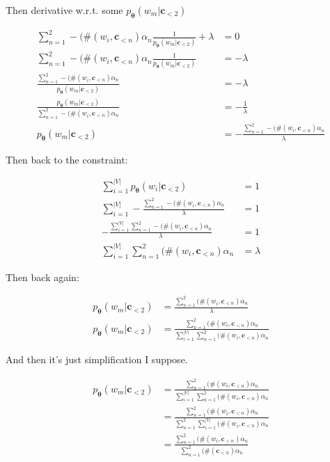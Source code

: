 \documentclass{article}
\newcommand{\vtheta}{\boldsymbol{\theta}}
\newcommand{\model}{p_{\vtheta}}
\newcommand{\context}{\boldsymbol{c}}
\begin{document}
			Then derivative w.r.t. some $\model(w_m | \context_{<2})$
			
			\begin{align}
				\sum^2_{n=1} -(\#(w_i, \context_{<n})\alpha_n \frac{1}{\model(w_m | \context_{<2})} + \lambda &= 0\\
				\sum^2_{n=1} -(\#(w_i, \context_{<n})\alpha_n \frac{1}{\model(w_m | \context_{<2})}  &= -\lambda\\
				\frac{\sum^2_{n=1} -(\#(w_i, \context_{<n})\alpha_n}{\model(w_m | \context_{<2})}  &= -\lambda\\
				\frac{\model(w_m | \context_{<2})}{\sum^2_{n=1} -(\#(w_i, \context_{<n})\alpha_n}  &= -\frac{1}{\lambda}\\
				\model(w_m | \context_{<2})  &= -\frac{\sum^2_{n=1} -(\#(w_i, \context_{<n})\alpha_n}{\lambda}
			\end{align}
			
			Then back to the constraint:
			
			\begin{align}
				\sum^{|V|}_{i=1} \model(w_i|\context_{<2}) &= 1\\
				\sum^{|V|}_{i=1} -\frac{\sum^2_{n=1} -(\#(w_i, \context_{<n})\alpha_n}{\lambda} &= 1\\
				 -\frac{ \sum^{|V|}_{i=1} \sum^2_{n=1} -(\#(w_i, \context_{<n})\alpha_n}{\lambda} &= 1\\
				  \sum^{|V|}_{i=1} \sum^2_{n=1} (\#(w_i, \context_{<n})\alpha_n &= \lambda
			\end{align}
			
			Then back again:
		
			\begin{align}
				\model(w_m | \context_{<2})  &= \frac{\sum^2_{n=1}  (\#(w_i, \context_{<n})\alpha_n}{\lambda}\\
				\model(w_m | \context_{<2})  &= \frac{\sum^2_{n=1} (\#(w_i, \context_{<n})\alpha_n}{\sum^{|V|}_{i=1} \sum^2_{n=1} (\#(w_i, \context_{<n})\alpha_n}
			\end{align}
			
			And then it's just simplification I suppose.
			
			\begin{align}
				\model(w_m | \context_{<2})  &= \frac{\sum^2_{n=1} (\#(w_i, \context_{<n})\alpha_n}{\sum^{|V|}_{i=1} \sum^2_{n=1} (\#(w_i, \context_{<n})\alpha_n}\\
				&= \frac{\sum^2_{n=1} (\#(w_i, \context_{<n})\alpha_n}{\sum^2_{n=1} \sum^{|V|}_{i=1} (\#(w_i, \context_{<n})\alpha_n}\\
				&= \frac{\sum^2_{n=1} (\#(w_i, \context_{<n})\alpha_n}{\sum^2_{n=1} (\#(\context_{<n})\alpha_n}		
			\end{align}
		
\end{document}
